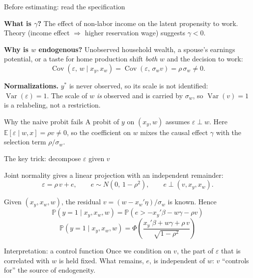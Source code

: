 \documentclass[aspectratio=169,11pt]{beamer}
\newcommand{\E}{\mathbb{E}}
\newcommand{\Pp}{\mathbb{P}}
\begin{document}
\begin{frame}{Before estimating: read the specification}

\textbf{What is $\gamma$?} The effect of non-labor income on the latent
propensity to work. Theory (income effect $\Rightarrow$ higher reservation
wage) suggests $\gamma<0$.

\pause

\vspace{0.3em}

\textbf{Why is $w$ endogenous?} Unobserved household wealth, a spouse's
earnings potential, or a taste for home production shift \emph{both}
$w$ and the decision to work:
\[
\operatorname{Cov}(\varepsilon,\,w\mid x_y,x_w)
=\operatorname{Cov}(\varepsilon,\,\sigma_w v)=\rho\,\sigma_w\neq 0 .
\]

\pause

\textbf{Normalizations.} $y^*$ is never observed, so its scale is not
identified: $\operatorname{Var}(\varepsilon)=1$. The scale of $w$
\emph{is} observed and is carried by $\sigma_w$, so
$\operatorname{Var}(v)=1$ is a relabeling, not a restriction.

\pause

\vspace{0.3em}

\begin{alertblock}{Why the naive probit fails}
A probit of $y$ on $(x_y,w)$ assumes $\varepsilon\perp w$. Here
$\E[\varepsilon\mid w,x]=\rho v\neq 0$, so the coefficient on $w$ mixes
the causal effect $\gamma$ with the selection term $\rho/\sigma_w$.
\end{alertblock}

\end{frame}

\begin{frame}{The key trick: decompose $\varepsilon$ given $v$}

Joint normality gives a linear projection with an independent remainder:
\[
\varepsilon = \rho\, v + e,
\qquad
e \sim N(0,\,1-\rho^2),
\qquad
e \perp (v, x_y, x_w).
\]

\pause

Given $(x_y,x_w,w)$, the residual $v=(w-x_w'\eta)/\sigma_w$ is known.
Hence
\[
\Pp(y=1\mid x_y,x_w,w)
=\Pp\!\left(e > -x_y'\beta - w\gamma - \rho v\right)
\]
\[
\boxed{
\Pp(y=1\mid x_y,x_w,w)
=\Phi\!\left(
\frac{x_y'\beta + w\gamma + \rho\,v}{\sqrt{1-\rho^2}}
\right)
}
\]

\pause

\begin{block}{Interpretation: a control function}
Once we condition on $v$, the part of $\varepsilon$ that is correlated with
$w$ is held fixed. What remains, $e$, is independent of $w$:
$v$ ``controls for'' the source of endogeneity.
\end{block}

\end{frame}
\end{document}
